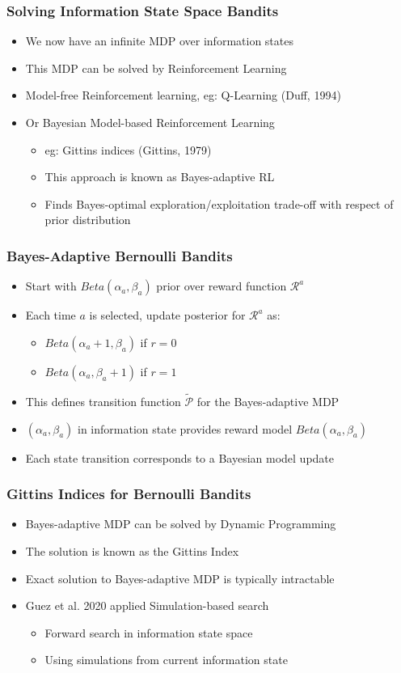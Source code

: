 \documentclass[handout]{beamer}
\begin{document}
\begin{frame}
\frametitle{Solving Information State Space Bandits}
\pause
\begin{itemize}[<+->]
\item We now have an infinite MDP over information states
\item This MDP can be solved by Reinforcement Learning
\item Model-free Reinforcement learning, eg: Q-Learning (Duff, 1994)
\item Or Bayesian Model-based Reinforcement Learning
\begin{itemize}
\item eg: Gittins indices (Gittins, 1979)
\item This approach is known as Bayes-adaptive RL
\item Finds Bayes-optimal exploration/exploitation trade-off with respect of prior distribution
\end{itemize}
\end{itemize}
\end{frame}

\begin{frame}
\frametitle{Bayes-Adaptive Bernoulli Bandits}
\pause
\begin{itemize}[<+->]
\item Start with $Beta(\alpha_a, \beta_a)$ prior over reward function $\mathcal{R}^a$
\item Each time $a$ is selected, update posterior for $\mathcal{R}^a$ as:
\begin{itemize}
\item $Beta(\alpha_a+1, \beta_a)$ if $r=0$
\item $Beta(\alpha_a, \beta_a+1)$ if $r=1$
\end{itemize}
\item This defines transition function $\tilde{\mathcal{P}}$ for the Bayes-adaptive MDP
\item $(\alpha_a, \beta_a)$ in information state provides reward model $Beta(\alpha_a, \beta_a)$
\item Each state transition corresponds to a Bayesian model update
\end{itemize}
\end{frame}

\begin{frame}
\frametitle{Gittins Indices for Bernoulli Bandits}
\pause
\begin{itemize}[<+->]
\item Bayes-adaptive MDP can be solved by Dynamic Programming
\item The solution is known as the Gittins Index
\item Exact solution to Bayes-adaptive MDP is typically intractable
\item Guez et al. 2020 applied Simulation-based search
\begin{itemize}
\item Forward search in information state space
\item Using simulations from current information state
\end{itemize}
\end{itemize}
\end{frame}
\end{document}
